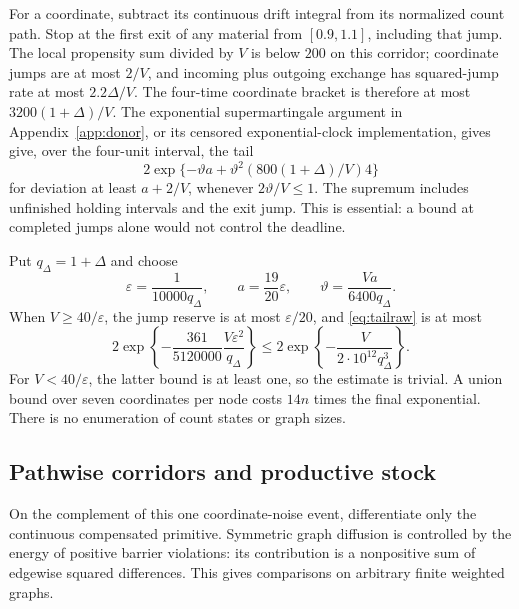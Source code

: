 \documentclass[11pt]{article}
\theoremstyle{definition}\newtheorem{definition}[theorem]{Definition}
\begin{document}
For a coordinate, subtract its continuous drift integral from its normalized count path.
Stop at the first exit of any material from $[0.9,1.1]$, including that jump.
The local propensity sum divided by $V$ is below $200$ on this corridor;
coordinate jumps are at most $2/V$, and incoming plus outgoing exchange has
squared-jump rate at most $2.2\Delta/V$. The four-time coordinate bracket is
therefore at most $3200(1+\Delta)/V$.
The exponential supermartingale argument in Appendix~\ref{app:donor}, or its
censored exponential-clock implementation, gives
give, over the four-unit interval, the tail
\begin{equation}\label{eq:tailraw}
2\exp\{-\vartheta a+\vartheta^2(800(1+\Delta)/V)4\}
\end{equation}
for deviation at least $a+2/V$, whenever $2\vartheta/V\le1$.
The supremum includes unfinished holding intervals and the exit jump.
This is essential: a bound at completed jumps alone would not control the deadline.

Put $q_\Delta=1+\Delta$ and choose
\begin{equation}\label{eq:tolerance}
\varepsilon=\frac1{10000q_\Delta},\qquad
a=\frac{19}{20}\varepsilon,\qquad
\vartheta=\frac{Va}{6400q_\Delta}.
\end{equation}
When $V\ge40/\varepsilon$, the jump reserve is at most $\varepsilon/20$, and
\eqref{eq:tailraw} is at most
\begin{equation}
2\exp\left\{-\frac{361}{5120000}\frac{V\varepsilon^2}{q_\Delta}\right\}
\le2\exp\left\{-\frac{V}{2\cdot10^{12}q_\Delta^3}\right\}.
\end{equation}
For $V<40/\varepsilon$, the latter bound is at least one, so the estimate is trivial.
A union bound over seven coordinates per node costs $14n$ times the final exponential.
There is no enumeration of count states or graph sizes.

\subsection{Pathwise corridors and productive stock}
On the complement of this one coordinate-noise event, differentiate only the continuous
compensated primitive. Symmetric graph diffusion is controlled by the energy of positive
barrier violations: its contribution is a nonpositive sum of edgewise squared differences.
This gives comparisons on arbitrary finite weighted graphs.
\end{document}
